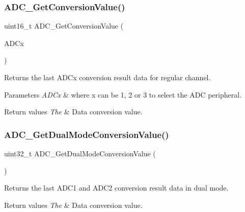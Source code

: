 \subsubsection{\texorpdfstring{ADC\_GetConversionValue()}{ADC\_GetConversionValue()}}
{\footnotesize\ttfamily uint16\+\_\+t A\+D\+C\+\_\+\+Get\+Conversion\+Value (\begin{DoxyParamCaption}\item[{\mbox{\hyperlink{struct_a_d_c___type_def}{A\+D\+C\+\_\+\+Type\+Def}} $\ast$}]{A\+D\+Cx }\end{DoxyParamCaption})}



Returns the last A\+D\+Cx conversion result data for regular channel. 


\begin{DoxyParams}{Parameters}
{\em A\+D\+Cx} & where x can be 1, 2 or 3 to select the A\+DC peripheral. \\
\hline
\end{DoxyParams}

\begin{DoxyRetVals}{Return values}
{\em The} & Data conversion value. \\
\hline
\end{DoxyRetVals}
\mbox{\label{group___a_d_c___private___functions_gac5a4792dc29ef7ff6bfbce9f37e8a668}} 
\subsubsection{\texorpdfstring{ADC\_GetDualModeConversionValue()}{ADC\_GetDualModeConversionValue()}}
{\footnotesize\ttfamily uint32\+\_\+t A\+D\+C\+\_\+\+Get\+Dual\+Mode\+Conversion\+Value (\begin{DoxyParamCaption}\item[{void}]{ }\end{DoxyParamCaption})}



Returns the last A\+D\+C1 and A\+D\+C2 conversion result data in dual mode. 


\begin{DoxyRetVals}{Return values}
{\em The} & Data conversion value. \\
\hline
\end{DoxyRetVals}
\mbox{\label{group___a_d_c___private___functions_gaa12546e51ec905c90a3aada432bd4633}} 
